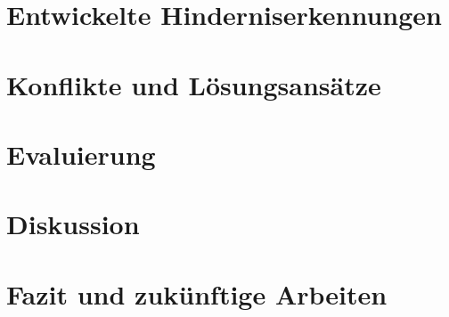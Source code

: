 \documentclass[pdftex,12pt,a4paper]{report}
\begin{document}

\chapter{Entwickelte Hinderniserkennungen}
\label{chp:developed_algorithms}



\chapter{Konflikte und Lösungsansätze}
\label{chp:conflicts}



\chapter{Evaluierung}
\label{chp:evaluation}



\chapter{Diskussion}
\label{chp:discussion}



\chapter{Fazit und zukünftige Arbeiten}
\label{chp:fazit}




\appendix






    


\nocite{zureiki2008stereo}
\nocite{opencvoreilly}
\nocite{cyganek2011introduction}

\end{document}
